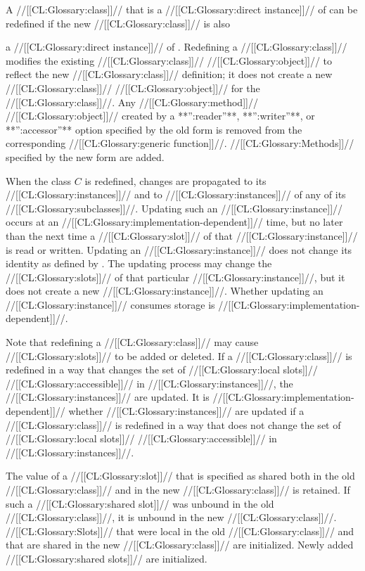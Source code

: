 A //[[CL:Glossary:class]]// that is a //[[CL:Glossary:direct instance]]// of  can
be redefined if the new //[[CL:Glossary:class]]// is also

a //[[CL:Glossary:direct instance]]// of .
Redefining a //[[CL:Glossary:class]]// modifies the existing
//[[CL:Glossary:class]]// //[[CL:Glossary:object]]// to reflect the new //[[CL:Glossary:class]]// definition; it does not
create a new //[[CL:Glossary:class]]// //[[CL:Glossary:object]]// for the //[[CL:Glossary:class]]//.  
Any //[[CL:Glossary:method]]// //[[CL:Glossary:object]]// created by a **'':reader''**, **'':writer''**, 
or **'':accessor''** option specified by the old  form is
removed from the corresponding //[[CL:Glossary:generic function]]//.
//[[CL:Glossary:Methods]]// specified by the new  form are added.




When the class $C$ is redefined, changes are propagated to its //[[CL:Glossary:instances]]//
and to //[[CL:Glossary:instances]]// of any of its //[[CL:Glossary:subclasses]]//.  Updating such an
//[[CL:Glossary:instance]]// occurs at an //[[CL:Glossary:implementation-dependent]]// time, but no later than
the next time a //[[CL:Glossary:slot]]// 
of that //[[CL:Glossary:instance]]// is read or written.  Updating an
//[[CL:Glossary:instance]]// 
does not change its identity as defined by .
The updating process may change the //[[CL:Glossary:slots]]// of that
particular //[[CL:Glossary:instance]]//, 
but it does not create a new //[[CL:Glossary:instance]]//.  Whether
updating an //[[CL:Glossary:instance]]// consumes storage is //[[CL:Glossary:implementation-dependent]]//.

Note that redefining a //[[CL:Glossary:class]]// may cause //[[CL:Glossary:slots]]// to be added or 
deleted.  If a //[[CL:Glossary:class]]// is redefined in a way that changes the set of
//[[CL:Glossary:local slots]]// //[[CL:Glossary:accessible]]// in //[[CL:Glossary:instances]]//, the //[[CL:Glossary:instances]]// 
are updated.  It is //[[CL:Glossary:implementation-dependent]]// whether //[[CL:Glossary:instances]]// 
are updated if a //[[CL:Glossary:class]]// is redefined in a way that does not change 
the set of //[[CL:Glossary:local slots]]// //[[CL:Glossary:accessible]]// in //[[CL:Glossary:instances]]//.

The value of a //[[CL:Glossary:slot]]// 
that is specified as shared both in the old //[[CL:Glossary:class]]//
and in the new //[[CL:Glossary:class]]// is retained.  
If such a //[[CL:Glossary:shared slot]]// was unbound
in the old //[[CL:Glossary:class]]//, it is unbound in the new //[[CL:Glossary:class]]//.  
//[[CL:Glossary:Slots]]// that
were local in the old //[[CL:Glossary:class]]// and that are shared in the new 
//[[CL:Glossary:class]]// are
initialized.  Newly added //[[CL:Glossary:shared slots]]// are initialized.

